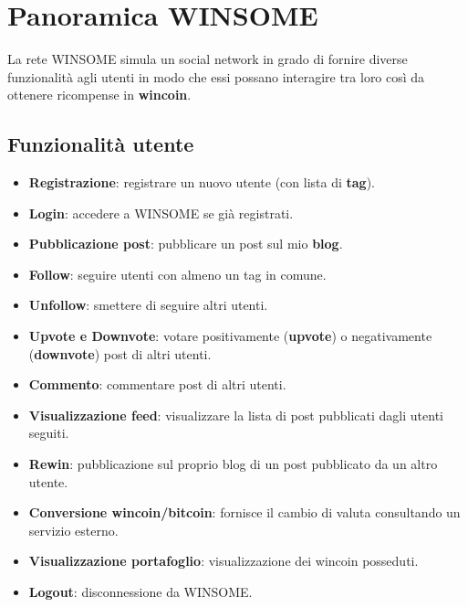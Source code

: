 \chapter{Panoramica WINSOME}
La rete WINSOME simula un social network in grado di fornire diverse funzionalit\`a agli utenti in modo che essi possano
interagire tra loro cos\`i da ottenere ricompense in \textbf{wincoin}.

\section{Funzionalit\`a utente}
\begin{itemize}
	\item \textbf{Registrazione}: registrare un nuovo utente (con lista di \textbf{tag}).
	\item \textbf{Login}: accedere a WINSOME se gi\`a registrati.
	\item \textbf{Pubblicazione post}: pubblicare un post sul mio \textbf{blog}.
	\item \textbf{Follow}: seguire utenti con almeno un tag in comune.
	\item \textbf{Unfollow}: smettere di seguire altri utenti.
	\item \textbf{Upvote e Downvote}: votare positivamente (\textbf{upvote}) o negativamente (\textbf{downvote}) post di
	      altri utenti.
	\item \textbf{Commento}: commentare post di altri utenti.
	\item \textbf{Visualizzazione feed}: visualizzare la lista di post pubblicati dagli utenti seguiti.
	\item \textbf{Rewin}: pubblicazione sul proprio blog di un post pubblicato da un altro utente.
	\item \textbf{Conversione wincoin/bitcoin}: fornisce il cambio di valuta consultando un servizio esterno.
	\item \textbf{Visualizzazione portafoglio}: visualizzazione dei wincoin posseduti.
	\item \textbf{Logout}: disconnessione da WINSOME.
\end{itemize}

